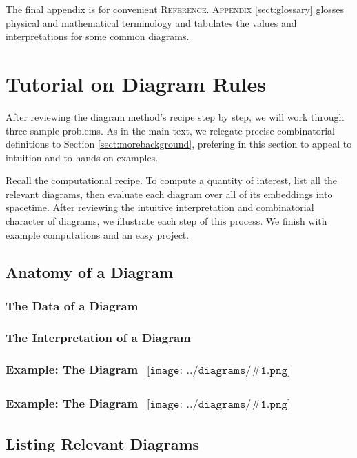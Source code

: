 \documentclass{article}
\theoremstyle{plain}
\theoremstyle{definition}
\newcommand{\sdia}[1]{\begin{gathered}\texttt{[image: ../diagrams/\#1.png]}\end{gathered}}
\begin{document}
    The final appendix is for convenient \textsc{Reference}.
    \textsc{Appendix} \ref{sect:glossary} glosses physical and mathematical
        terminology and tabulates the values and interpretations for some
        common diagrams.

\section{Tutorial on Diagram Rules} \label{sect:tutorial}

    After reviewing the diagram method's recipe step by step, we will work
    through three sample problems.  As in the main text, we
    relegate precise combinatorial definitions to Section
    \ref{sect:morebackground}, prefering in this section to appeal to intuition
    and to hands-on examples.

    Recall the computational recipe.  To compute a quantity of interest, list
    all the relevant diagrams, then evaluate each diagram over all of its
    embeddings into spacetime.  After reviewing the intuitive interpretation
    and combinatorial character of diagrams, we illustrate each step of this
    process.  We finish with example computations and an easy project.

    \subsection{Anatomy of a Diagram}
        \subsubsection*{The Data of a Diagram}
        \subsubsection*{The Interpretation of a Diagram}
        \subsubsection*{Example: The Diagram $\sdia{(01-2-3)(02-12-23)}$}
        \subsubsection*{Example: The Diagram $\sdia{c(01)(01)}$}

    \subsection{Listing Relevant Diagrams}
\end{document}

